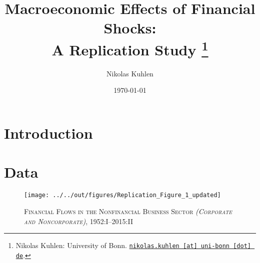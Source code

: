 \documentclass[12pt,a4paper,leqno]{article}
\begin{document}
\title{Macroeconomic Effects of Financial Shocks: \\A Replication Study
\thanks{Nikolas Kuhlen: University of Bonn. \href{mailto:nikolas.kuhlen@uni-bonn.de} {\nolinkurl{nikolas.kuhlen [at] uni-bonn [dot] de}}.}
}

\author{Nikolas Kuhlen
}

\date{\today}

\maketitle


\clearpage

\section{Introduction} %
\label{sec:introduction}


\newpage
\section{Data} %
\label{sec:data}


\begin{figure}
    
    \centering

    \texttt{[image: ../../out/figures/Replication\_Figure\_1\_updated]}

    \caption{\textsc{Financial Flows in the Nonfinancial Business Sector \textit{(Corporate and Noncorporate)}}, 1952:I--2015:II}
    
    \label{fig:figure_1}

\end{figure}
\end{document}
